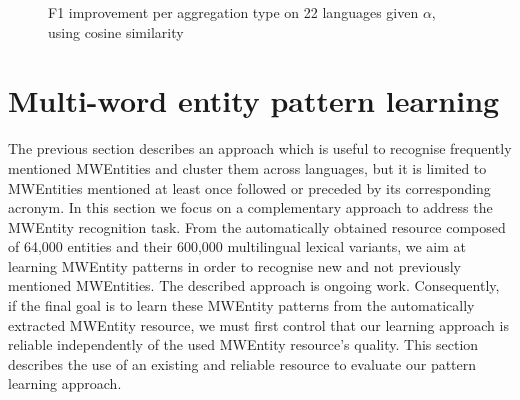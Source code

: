 \documentclass[output=paper]{langsci/langscibook}
\begin{document}
\begin{figure}
\caption{F1 improvement per aggregation type on 22 languages given $\alpha$, using cosine similarity}
\label{jac:fig:Eval22l}
\end{figure}

\section{Multi-word entity pattern learning}
\label{jac:chap10sec4}
The previous section describes an approach which is useful to recognise frequently mentioned MWEntities and cluster them across languages, but it is limited to MWEntities mentioned at least once followed or preceded by its corresponding acronym. In this section we focus on a complementary approach to address the MWEntity recognition task. From the automatically obtained resource composed of 64,000 entities and their 600,000 multilingual lexical variants, we aim at learning MWEntity patterns in order to recognise new and not previously mentioned MWEntities. The described approach is ongoing work. Consequently, if the final goal is to learn these MWEntity patterns from the automatically extracted MWEntity resource, we must first control that our learning approach is reliable independently of the used MWEntity resource's quality. This section describes the use of an existing and reliable resource to evaluate our pattern learning approach.
\end{document}
